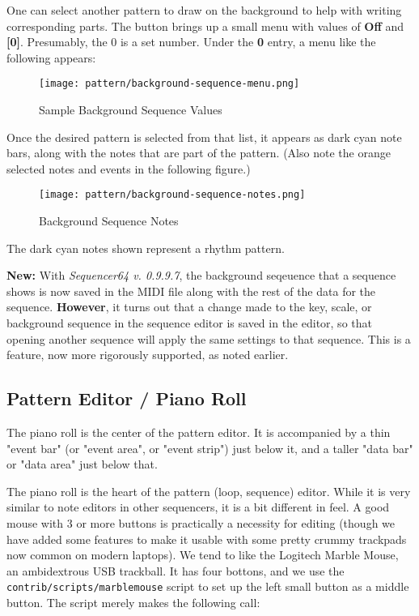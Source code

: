    One can select another pattern to draw on the background to help with
   writing corresponding parts.
   The button brings up a small menu with values of \textbf{Off} and
   \textbf{[0]}.  Presumably, the 0 is a set number.  Under the \textbf{0}
   entry, a menu like the following appears:

\begin{figure}[H]
   \centering 
   \texttt{[image: pattern/background-sequence-menu.png]}
   \caption{Sample Background Sequence Values}
   \label{fig:pattern_editor_background_sequence_menu}
\end{figure}

   Once the desired pattern is selected from that list, it appears as
   dark cyan note bars, along with the notes that are part of the pattern.
   (Also note the orange selected notes and events in the following figure.)

\begin{figure}[H]
   \centering 
   \texttt{[image: pattern/background-sequence-notes.png]}
   \caption{Background Sequence Notes}
   \label{fig:pattern_editor_background_sequence_notes}
\end{figure}

   The dark cyan notes shown represent a rhythm pattern.

   \textbf{New:}
   With \textsl{Sequencer64 v. 0.9.9.7}, the background seqeuence that a
   sequence shows is now saved in the MIDI file along with the rest of the
   data for the sequence.
   \textbf{However},
   it turns out that a change made to the key, scale, or background sequence in
   the sequence editor is saved in the editor, so that opening another sequence
   will apply the same settings to that sequence.  This is a feature, now
   more rigorously supported, as noted earlier.

\subsection{Pattern Editor / Piano Roll}
\label{subsec:seq64_pattern_editor_piano_roll}

   The piano roll is the center of the pattern editor.  It is accompanied by a
   thin "event bar" (or "event area", or "event strip") just below it,
   and a taller "data bar" or "data area" just below that.

   The piano roll is the heart of the pattern (loop, sequence) editor.
   While it is very similar to note editors in other sequencers, it is a bit
   different in feel.  A good mouse with 3 or more buttons is practically a
   necessity for editing (though we have added some features to make it
   usable with some pretty crummy trackpads now common on modern laptops).
   We tend to like the Logitech Marble Mouse, an
   ambidextrous USB trackball.  It has four bottons, and we use the
   \texttt{contrib/scripts/marblemouse} script to set up the left small
   button as a middle button.  The script merely makes the following call:

